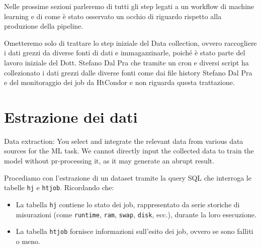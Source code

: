 Nelle prossime sezioni parleremo di tutti gli step legati a un workflow di
machine learning e di come è stato osservato un occhio di riguardo rispetto
alla produzione della pipeline.

Ometteremo solo di trattare lo step iniziale del Data collection, ovvero
raccogliere i dati grezzi da diverse fonti di dati e immagazzinarle, poiché
è stato parte del lavoro iniziale del Dott. Stefano Dal Pra che tramite un cron e
diversi script ha collezionato i dati grezzi dalle diverse fonti come dai file history 
Stefano Dal Pra e del monitoraggio dei job da HtCondor e non  riguarda questa
trattazione.



\section{Estrazione dei dati} %





Data extraction: You select and integrate the relevant data from various data sources for the ML task.
We cannot directly input the collected data to train the model without pr-processing it, as it may generate an abrupt result.

Procediamo con l'estrazione di un dataset tramite la query SQL che
interroga le tabelle \texttt{hj} e \texttt{htjob}. Ricordando che:
\begin{itemize}
    \item La tabella \texttt{hj} contiene lo stato dei job, rappresentato da
        serie storiche di misurazioni (come \texttt{runtime}, \texttt{ram},
        \texttt{swap}, \texttt{disk}, ecc.),
        durante la loro esecuzione.
    \item La tabella \texttt{htjob} fornisce informazioni sull'esito dei job,
        ovvero se sono falliti o meno.
\end{itemize}


